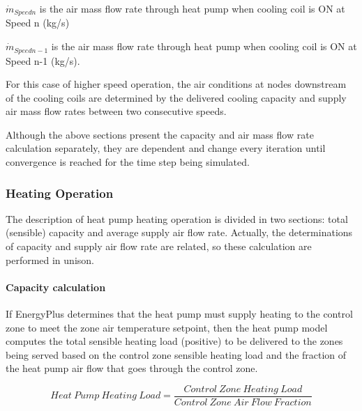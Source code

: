 \({\dot m_{Speedn}}\) is the air mass flow rate through heat pump when cooling coil is ON at Speed n (kg/s)

\({\dot m_{Speedn-1}}\) is the air mass flow rate through heat pump when cooling coil is ON at Speed n-1 (kg/s).

For this case of higher speed operation, the air conditions at nodes downstream of the cooling coils are determined by the delivered cooling capacity and supply air mass flow rates between two consecutive speeds.

Although the above sections present the capacity and air mass flow rate calculation separately, they are dependent and change every iteration until convergence is reached for the time step being simulated.

\subsubsection{Heating Operation}\label{heating-operation-1}

The description of heat pump heating operation is divided in two sections: total (sensible) capacity and average supply air flow rate. Actually, the determinations of capacity and supply air flow rate are related, so these calculation are performed in unison.

\paragraph{Capacity calculation}\label{capacity-calculation-1}

If EnergyPlus determines that the heat pump must supply heating to the control zone to meet the zone air temperature setpoint, then the heat pump model computes the total sensible heating load (positive) to be delivered to the zones being served based on the control zone sensible heating load and the fraction of the heat pump air flow that goes through the control zone.

\begin{equation}
Heat~Pump~Heating~Load = \frac{{Control~Zone~Heating~Load}}{{Control~Zone~Air~Flow~Fraction}}
\end{equation}

